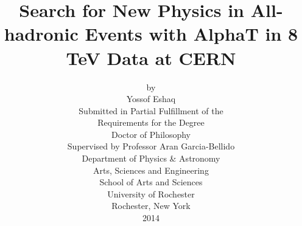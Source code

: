 \documentclass[11pt,letter,twoside,psfig,epsfig,]{article}
\newcommand{\clearemptydoublepage}{\newpage{\pagestyle{empty}\cleardoublepage}}
\begin{document}
\title{{\boldmath Search for New Physics in All-hadronic Events with AlphaT in 8 TeV Data at CERN}}

\author{
  by\\
  Yossof Eshaq\vspace{4mm}\\
  {Submitted in Partial Fulfillment of the }\\
  {Requirements for the Degree}\\
  {Doctor of Philosophy}\\[1cm]
  Supervised by Professor Aran Garcia-Bellido\\[4mm]
  Department of Physics \& Astronomy\\
  Arts, Sciences and Engineering \\
  School of Arts and Sciences\\[1cm]
  University of Rochester\\
  Rochester, New York\\
  2014
}
\date{}
\maketitle
\clearpage





\clearemptydoublepage
\clearemptydoublepage

\clearpage
\end{document}
